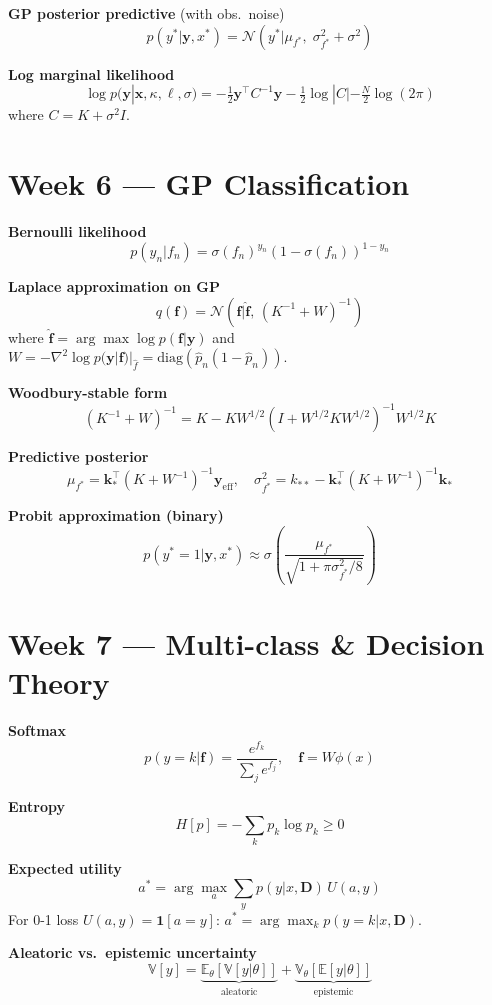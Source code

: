 \documentclass[9pt,a4paper]{extarticle}
\newcommand{\N}{\mathcal{N}}
\newcommand{\E}{\mathbb{E}}
\newcommand{\diag}{\mathrm{diag}}
\renewcommand{\vec}[1]{\bm{#1}}
\begin{document}
\textbf{GP posterior predictive} (with obs.\ noise)
\[
p(y^*|\vec{y},x^*) = \N(y^*|\mu_{f^*},\;\sigma^2_{f^*}+\sigma^2)
\]

\textbf{Log marginal likelihood}
\[
\log p(\vec{y}|\vec{x},\kappa,\ell,\sigma) = -\tfrac{1}{2}\vec{y}^\top C^{-1}\vec{y} -\tfrac{1}{2}\log|C| - \tfrac{N}{2}\log(2\pi)
\]
where $C = K+\sigma^2 I$.

\section{Week 6 — GP Classification}

\textbf{Bernoulli likelihood}
\[
p(y_n|f_n)=\sigma(f_n)^{y_n}(1-\sigma(f_n))^{1-y_n}
\]

\textbf{Laplace approximation on GP}
\[
q(\vec{f}) = \N(\vec{f}|\hat{\vec{f}},\,(K^{-1}+W)^{-1})
\]
where $\hat{\vec{f}}=\arg\max\log p(\vec{f}|\vec{y})$ and $W=-\nabla^2\log p(\vec{y}|\vec{f})|_{\hat{f}}=\diag(\hat{p}_n(1-\hat{p}_n))$.

\textbf{Woodbury-stable form}
\[
(K^{-1}+W)^{-1} = K - KW^{1/2}(I+W^{1/2}KW^{1/2})^{-1}W^{1/2}K
\]

\textbf{Predictive posterior}
\[
\mu_{f^*} = \vec{k}_*^\top(K+W^{-1})^{-1}\vec{y}_\text{eff},\quad
\sigma^2_{f^*} = k_{**} - \vec{k}_*^\top(K+W^{-1})^{-1}\vec{k}_*
\]

\textbf{Probit approximation (binary)}
\[
p(y^*=1|\vec{y},x^*) \approx \sigma\!\left(\frac{\mu_{f^*}}{\sqrt{1+\pi\sigma^2_{f^*}/8}}\right)
\]

\section{Week 7 — Multi-class \& Decision Theory}

\textbf{Softmax}
\[
p(y=k|\vec{f}) = \frac{e^{f_k}}{\sum_j e^{f_j}},\quad \vec{f}=W\phi(x)
\]

\textbf{Entropy}
\[
H[p] = -\sum_k p_k\log p_k \geq 0
\]

\textbf{Expected utility}
\[
a^* = \arg\max_a \sum_y p(y|x,\vec{D})\,U(a,y)
\]
For 0-1 loss $U(a,y)=\mathbf{1}[a=y]$: $a^*=\arg\max_k p(y=k|x,\vec{D})$.

\textbf{Aleatoric vs.\ epistemic uncertainty}
\[
\mathbb{V}[y] = \underbrace{\E_\theta[\mathbb{V}[y|\theta]]}_{\text{aleatoric}} + \underbrace{\mathbb{V}_\theta[\E[y|\theta]]}_{\text{epistemic}}
\]
\end{document}
